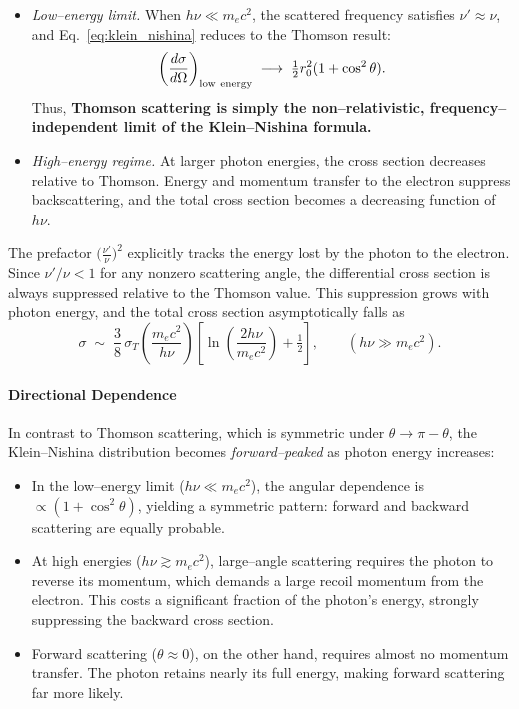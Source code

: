\begin{itemize}
    \item \emph{Low--energy limit.}  
          When $h\nu \ll m_e c^2$, the scattered frequency satisfies
          $\nu' \approx \nu$, and Eq.~\eqref{eq:klein_nishina} reduces to
          the Thomson result:
          \[
              \left(\frac{d\sigma}{d\Omega}\right)_{\rm low~energy}
              \;\longrightarrow\; \tfrac{1}{2} r_0^2 (1+\cos^2\theta).
          \]
          Thus, \textbf{Thomson scattering is simply the
          non--relativistic, frequency--independent limit of the
          Klein--Nishina formula.}

    \item \emph{High--energy regime.}  
          At larger photon energies, the cross section decreases relative
          to Thomson. Energy and momentum transfer to the electron
          suppress backscattering, and the total cross section becomes a
          decreasing function of $h\nu$.
\end{itemize}

\noindent
The prefactor $\big(\tfrac{\nu'}{\nu}\big)^2$ explicitly tracks the
energy lost by the photon to the electron. Since
$\nu'/\nu < 1$ for any nonzero scattering angle, the differential cross
section is always suppressed relative to the Thomson value. This
suppression grows with photon energy, and the total cross section
asymptotically falls as
\[
    \sigma \;\sim\; \frac{3}{8}\,\sigma_T
    \left(\frac{m_e c^2}{h\nu}\right)
    \left[\ln\!\left(\frac{2h\nu}{m_e c^2}\right) + \tfrac{1}{2}\right],
    \qquad (h\nu \gg m_e c^2).
\]

\paragraph{Directional Dependence}

In contrast to Thomson scattering, which is symmetric under
$\theta \to \pi-\theta$, the Klein--Nishina distribution becomes
\emph{forward--peaked} as photon energy increases:
\begin{itemize}
    \item In the low--energy limit ($h\nu \ll m_e c^2$), the angular
          dependence is $\propto (1+\cos^2\theta)$, yielding a symmetric
          pattern: forward and backward scattering are equally probable.
    \item At high energies ($h\nu \gtrsim m_e c^2$), large--angle
          scattering requires the photon to reverse its momentum, which
          demands a large recoil momentum from the electron. This costs a
          significant fraction of the photon’s energy, strongly
          suppressing the backward cross section.
    \item Forward scattering ($\theta \approx 0$), on the other hand,
          requires almost no momentum transfer. The photon retains nearly
          its full energy, making forward scattering far more likely.
\end{itemize}

